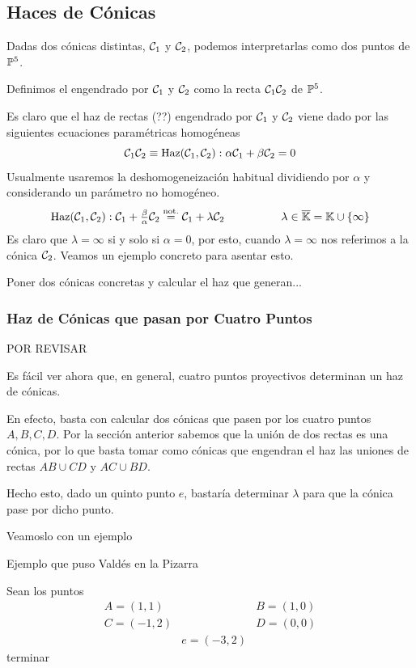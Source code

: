 \subsection{Haces de Cónicas}
Dadas dos cónicas distintas, $\mathcal{C}_1$ y $\mathcal{C}_2$, podemos interpretarlas como dos puntos de $\mathbb{P}^5$.
\begin{defi}
	Definimos el  engendrado por $\mathcal{C}_1$ y $\mathcal{C}_2$ como la recta $\mathcal{C}_1\mathcal{C}_2$ de $\mathbb{P}^5$.
\end{defi}
Es claro que el haz de rectas (??) engendrado por $\mathcal{C}_1$ y $\mathcal{C}_2$ viene dado por las siguientes ecuaciones paramétricas homogéneas
\[\mathcal{C}_1\mathcal{C}_2\equiv\mathrm{Haz}(\mathcal{C}_1,\mathcal{C}_2):\alpha\mathcal{C}_1+\beta\mathcal{C}_2=0\]
Usualmente usaremos la deshomogeneización habitual dividiendo por $\alpha$ y considerando un parámetro no homogéneo.
\[\begin{array}{cc}\mathrm{Haz}(\mathcal{C}_1,\mathcal{C}_2):\mathcal{C}_1+\frac{\beta}{\alpha}\mathcal{C}_2\stackrel{\mathrm{not.}}{=}\mathcal{C}_1+\lambda\mathcal{C}_2\qquad&\qquad\lambda\in\overline{\mathbb{K}}=\mathbb{K}\cup\{\infty\}\end{array}\]
Es claro que $\lambda=\infty$ si y solo si $\alpha=0$, por esto, cuando $\lambda=\infty$ nos referimos a la cónica $\mathcal{C}_2$.
Veamos un ejemplo concreto para asentar esto.
\begin{exa}
	Poner dos cónicas concretas y calcular el haz que generan...
\end{exa}
\subsubsection{Haz de Cónicas que pasan por Cuatro Puntos}
POR REVISAR

Es fácil ver ahora que, en general, cuatro puntos proyectivos determinan un haz de cónicas.

En efecto, basta con calcular dos cónicas que pasen por los cuatro puntos $A,B,C,D$. Por la sección anterior sabemos que la unión de dos rectas es una cónica, por lo que basta tomar como cónicas que engendran el haz las uniones de rectas $AB\cup CD$ y $AC\cup BD$.

Hecho esto, dado un quinto punto $e$, bastaría determinar $\lambda$ para que la cónica pase por dicho punto.

Veamoslo con un ejemplo
\begin{exa}
	Ejemplo que puso Valdés en la Pizarra
	
	Sean los puntos
	\[\begin{array}{ccc}
		A=(1,1)&&B=(1,0)\\
		C=(-1,2)&&D=(0,0)\\
		&e=(-3,2)&
	\end{array}\]
	terminar
\end{exa}
